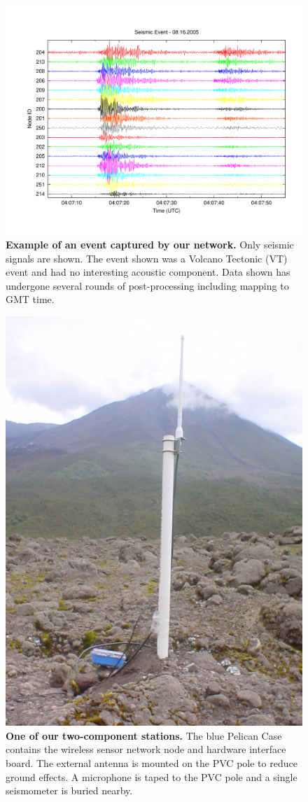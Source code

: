 \begin{figure}[t]
\label{includegraphics-fig-plot}
\begin{center}
\includegraphics[width=0.7\hsize]{./4-casestudy/figs/TEST}
\end{center}
\caption{\textbf{Example of an event captured by our network.}  Only
seismic signals are shown.  The event shown was a Volcano Tectonic (VT) event
and had no interesting acoustic component.  Data shown has undergone several
rounds of post-processing including mapping to GMT time.}
\end{figure}

\begin{figure}[t]
\begin{center}
\includegraphics[width=0.7\hsize]{./4-casestudy/figs/Node-212-5}
\end{center}
\caption{\textbf{One of our two-component stations.} The blue Pelican
Case contains the wireless sensor network node and hardware interface board.
The external antenna is mounted on the PVC pole to reduce ground effects.
A microphone is taped to the PVC pole and a single seismometer is buried
nearby.}
\label{includegraphics-fig-station2}
\end{figure}

